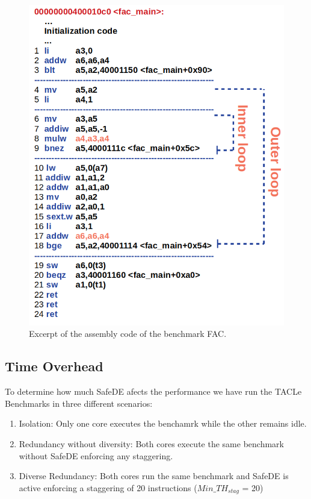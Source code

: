 \begin{figure}[h]
    \centering
    \includegraphics[scale=1]{img/fac_assembly.png}
    \caption{Excerpt of the assembly code of the benchmark FAC.} 
    \label{fig:fac_assembly}
\end{figure}

\bigskip



\subsection{Time Overhead}

To determine how much SafeDE afects the performance we have run the TACLe Benchmarks in three different scenarios:

\begin{enumerate}
    \item Isolation: Only one core executes the benchamrk while the other remains idle.
    \item Redundancy without diversity: Both cores execute the same benchmark without SafeDE enforcing any staggering. 
    \item Diverse Redundancy: Both cores run the same benchmark and SafeDE is active enforcing a staggering of 20 instructions ($Min\_TH_{stag}$ = 20)
\end{enumerate}

